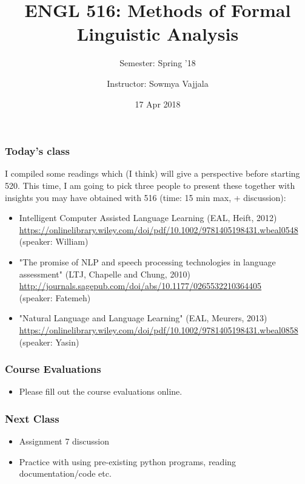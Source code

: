 \documentclass{beamer}
\author[Sowmya Vajjala]{Instructor: Sowmya Vajjala}
\title[ENGL 516]{ENGL 516: Methods of Formal Linguistic Analysis}
\subtitle{Semester: Spring '18}
\date{17 Apr 2018}
\institute{Iowa State University, USA}
\begin{document}
\begin{frame}\titlepage
\end{frame}

\begin{frame}
\frametitle{Today's class}
I compiled some readings which (I think) will give a perspective before starting 520. This time, I am going to pick three people to present these together with insights you may have obtained with 516 (time: 15 min max, + discussion): \small
\begin{itemize}
\item Intelligent Computer Assisted Language Learning (EAL, Heift, 2012)
\\ \footnotesize \url{https://onlinelibrary.wiley.com/doi/pdf/10.1002/9781405198431.wbeal0548}
\\(speaker: William) \small
\item "The promise of NLP and speech processing technologies in language assessment" (LTJ, Chapelle and Chung, 2010)
\\ \footnotesize \url{http://journals.sagepub.com/doi/abs/10.1177/0265532210364405}
\\ (speaker: Fatemeh) \small
\item "Natural Language and Language Learning" (EAL, Meurers, 2013)
\\ \footnotesize \url{https://onlinelibrary.wiley.com/doi/pdf/10.1002/9781405198431.wbeal0858}
\\(speaker: Yasin) \small

\end{itemize}
\end{frame}

\begin{frame}
\frametitle{Course Evaluations}
\begin{itemize}
\item Please fill out the course evaluations online. 
\end{itemize}
\end{frame}

\begin{frame}
\frametitle{Next Class}
\begin{itemize}
\item Assignment 7 discussion
\item Practice with using pre-existing python programs, reading documentation/code etc.
\end{itemize}
\end{frame}
\end{document}
